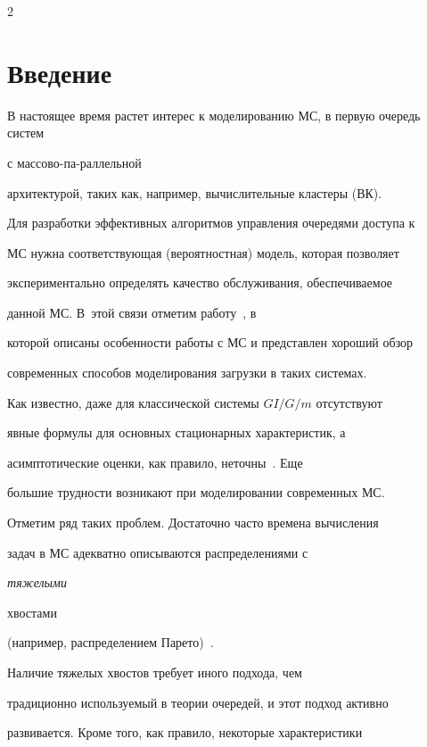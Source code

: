       \begin{multicols}{2}



            \label{st\stat}

            

\section{Введение}



В настоящее время растет интерес к моделированию МС,  в первую очередь сис\-тем 

с массово-па-\linebreak раллельной

архитектурой, таких как, например,  вы\-чис\-ли\-тель\-ные клас\-те\-ры (ВК).

Для разработки эффектив\-ных алгоритмов управления очередями доступа к

МС нужна соответствующая (вероятностная) модель, которая позволяет

экспериментально определять качество обслуживания, обеспе\-чи\-ва\-емое

данной МС.  В~этой связи отметим работу~\cite{feit-coplot}, в

которой описаны особенности работы с МС и представлен хороший обзор

современных способов моделирования загрузки в таких системах.



Как известно, даже для классической системы $GI/G/m$  отсутствуют

явные формулы для   основных стационарных характеристик, а

асимптотические оценки, как правило, неточны~\cite{gupta10}. Еще

большие    трудности возникают  при моделировании современных МС.

Отметим ряд таких проблем. Достаточно часто  времена вычисления

задач в МС  адекватно описываются  распределениями с {\it тяжелыми

хвостами} (например, распределением Парето)~\cite{feit-coplot, gupta10}. 

Наличие тяжелых хвостов требует иного подхода, чем

традиционно используемый в теории очередей, и этот подход активно

развивается. Кроме того, как правило, некоторые характеристики


\end{multicols}

